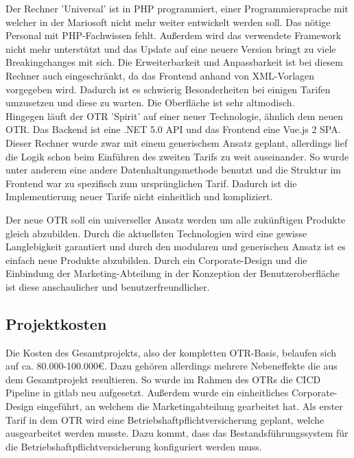 Der Rechner 'Universal' ist in PHP programmiert, einer Programmiersprache mit welcher in der Mariosoft nicht mehr weiter entwickelt werden soll. Das nötige Personal mit PHP-Fachwissen fehlt. Außerdem wird das verwendete Framework nicht mehr unterstützt und das Update auf eine neuere Version bringt zu viele Breakingchanges mit sich. Die Erweiterbarkeit und Anpassbarkeit ist bei diesem Rechner auch eingeschränkt, da das Frontend anhand von XML-Vorlagen vorgegeben wird. Dadurch ist es schwierig Besonderheiten bei einigen Tarifen umzusetzen und diese zu warten. Die Oberfläche ist sehr altmodisch. \\
Hingegen läuft der \ac{OTR} 'Spirit' auf einer neuer Technologie, ähnlich dem neuen \ac{OTR}. Das Backend ist eine .NET 5.0 API und das Frontend eine Vue.js 2 \ac{SPA}. Dieser Rechner wurde zwar mit einem generischem Ansatz geplant, allerdings lief die Logik schon beim Einführen des zweiten Tarifs zu weit auseinander. So wurde unter anderem eine andere Datenhaltungsmethode benutzt und die Struktur im Frontend war zu spezifisch zum ursprünglichen Tarif. Dadurch ist die Implementierung neuer Tarife nicht einheitlich und kompliziert.

Der neue \ac{OTR} soll ein universeller Ansatz werden um alle zukünftigen Produkte gleich abzubilden. Durch die aktuellsten Technologien wird eine gewisse Langlebigkeit garantiert und durch den modularen und generischen Ansatz ist es einfach neue Produkte abzubilden. Durch ein Corporate-Design und die Einbindung der Marketing-Abteilung in der Konzeption der Benutzeroberfläche ist diese anschaulicher und benutzerfreundlicher.
\subsection{Projektkosten}
\label{projektkosten}
Die Kosten des Gesamtprojekts, also der kompletten \ac{OTR}-Basis, belaufen sich auf ca. 80.000-100.000€. Dazu gehören allerdings mehrere Nebeneffekte die aus dem Gesamtprojekt resultieren. So wurde im Rahmen des \ac{OTR}s die \ac{CICD} Pipeline in \gls{gitlab} neu aufgesetzt. Außerdem wurde ein einheitliches Corporate-Design eingeführt, an welchem die Marketingabteilung gearbeitet hat. Als erster Tarif in dem \ac{OTR} wird eine Betriebshaftpflichtversicherung geplant, welche ausgearbeitet werden musste. Dazu kommt, dass das Bestandsführungssystem für die Betriebshaftpflichtversicherung konfiguriert werden muss.\\

